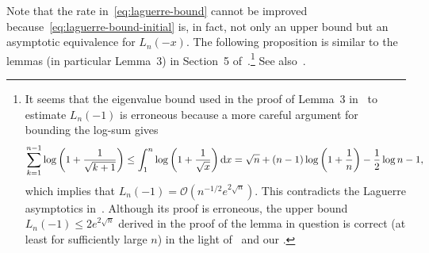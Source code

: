 \documentclass{mcom-l}
\numberwithin{equation}{section}
\numberwithin{theorem}{section} %
\begin{document}
Note that the rate in~\eqref{eq:laguerre-bound} cannot be improved because~\eqref{eq:laguerre-bound-initial} is, in fact, not only an upper bound but an asymptotic equivalence for $L_n(-x)$.
The following proposition is similar to the lemmas (in particular Lemma~3) in Section~5 of~\cite{Zwicknagl2009}.\footnote{It seems that the eigenvalue bound used in the proof of Lemma~3 in~\cite{Zwicknagl2009} to estimate $L_n(-1)$ is erroneous because a more careful argument for bounding the log-sum gives
  \begin{equation*}
    \sum_{k=1}^{n-1} \log \bigg(1 + \frac{1}{\sqrt{k+1}} \bigg) \leq \int_1^n \log \bigg(1 + \frac{1}{\sqrt{x}} \bigg) \dif x = \sqrt{n} + (n-1)\log\bigg( 1 + \frac{1}{n}\bigg) - \frac{1}{2} \log n - 1,
  \end{equation*}
  which implies that $L_n(-1) = \mathcal{O}(n^{-1/2} e^{2\sqrt{n}})$.
  This contradicts the Laguerre asymptotics in~\cite{Borwein2008}.
  Although its proof is erroneous, the upper bound $L_n(-1) \leq 2 e^{2\sqrt{n}}$ derived in the proof of the lemma in question is correct (at least for sufficiently large $n$) in the light of~\cite{Borwein2008} and our .
}
See also~\cite[Sec.\@~6.4]{ZwicknaglSchaback2013}.
\end{document}
